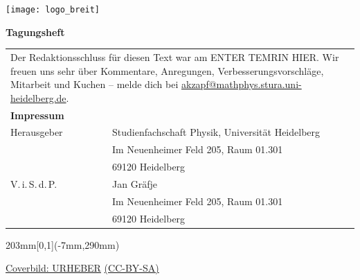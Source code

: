 \documentclass[a5paper]{scrbook}
\begin{document}
\pagestyle{empty}
\centering
\texttt{[image: logo\_breit]} 

\vspace*{14cm} \centering \fontsize{40}{48} \textbf{Tagungsheft}
\normalsize

      
\null
\newpage
{}
\vspace*{\fill}
    \begin{tabular*}{0.77\textwidth}{ll}
        \multicolumn{2}{l}{
            \parbox{0.77\textwidth}{
                Der Redaktionsschluss für diesen Text war am ENTER TEMRIN HIER. Wir freuen uns
                sehr über Kommentare, Anregungen, Verbesserungsvorschläge,
                Mitarbeit und Kuchen -- melde dich bei
                \href{mailto:akzapf@mathphys.stura.uni-heidelberg.de}{akzapf@mathphys.stura.uni-heidelberg.de}.
            }
            \vspace{5cm}
        }\\
        \textbf{Impressum} &\\
        Herausgeber & Studienfachschaft Physik, Universität Heidelberg \\
        & Im Neuenheimer Feld 205, Raum 01.301\\
        & 69120 Heidelberg\\
        V.\,i.\,S.\,d.\,P. & Jan Gräfje\\
        & Im Neuenheimer Feld 205, Raum 01.301\\
        & 69120 Heidelberg\\
    \end{tabular*}

    \vfill

    \begin{textblock*}{203mm}[0,1](-7mm,290mm)
        \begin{flushright}
            \footnotesize
            \href{http://mathphys.info}{Coverbild: URHEBER} \href{http://creativecommons.org/licenses/by-sa/4.0/}{(CC-BY-SA)}\\  
        \end{flushright}
    \end{textblock*}
\end{document}
